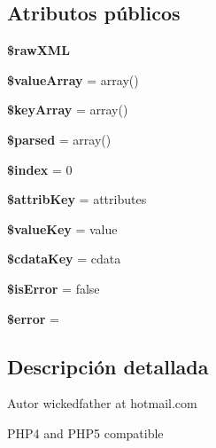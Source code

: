 \subsection*{Atributos públicos}
\begin{DoxyCompactItemize}
\item 
\mbox{\label{classXMLThing_a07538f3f144881632ffd11d3699e5562}} 
{\bfseries \$raw\+X\+ML}
\item 
\mbox{\label{classXMLThing_a0c4f39e54503d71299dc274d787dd0f3}} 
{\bfseries \$value\+Array} = array()
\item 
\mbox{\label{classXMLThing_a49615464bf3ef0a0ef606179ff55afc1}} 
{\bfseries \$key\+Array} = array()
\item 
\mbox{\label{classXMLThing_a0f4ddacd5ff9a4dabcbddc39aa47f9c5}} 
{\bfseries \$parsed} = array()
\item 
\mbox{\label{classXMLThing_a9165f7eec1b7840c6076b294ef497f68}} 
{\bfseries \$index} = 0
\item 
\mbox{\label{classXMLThing_a658a4bd3bff6ade05283ad48aec5379b}} 
{\bfseries \$attrib\+Key} = \textquotesingle{}attributes\textquotesingle{}
\item 
\mbox{\label{classXMLThing_a9948e8517f8b349298a20d9286a3b2b7}} 
{\bfseries \$value\+Key} = \textquotesingle{}value\textquotesingle{}
\item 
\mbox{\label{classXMLThing_a445699d05b90f941d5b09ad3331da61a}} 
{\bfseries \$cdata\+Key} = \textquotesingle{}cdata\textquotesingle{}
\item 
\mbox{\label{classXMLThing_a4d29070c404490ab9ef64c44485fb330}} 
{\bfseries \$is\+Error} = false
\item 
\mbox{\label{classXMLThing_afd5fee61b2486f3c5f03b0da62f69b62}} 
{\bfseries \$error} = \textquotesingle{}\textquotesingle{}
\end{DoxyCompactItemize}


\subsection{Descripción detallada}
\begin{DoxyAuthor}{Autor}
wickedfather at hotmail.\+com
\end{DoxyAuthor}
P\+H\+P4 and P\+H\+P5 compatible

